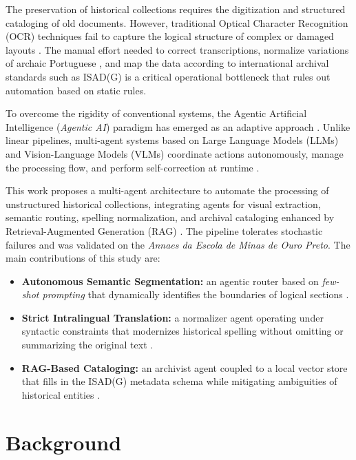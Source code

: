 \documentclass[conference]{IEEEtran}
\begin{document}
The preservation of historical collections requires the digitization and structured cataloging of old documents. However, traditional Optical Character Recognition (OCR) techniques fail to capture the logical structure of complex or damaged layouts \cite{surveyOCR}. The manual effort needed to correct transcriptions, normalize variations of archaic Portuguese \cite{traducaointralingual}, and map the data according to international archival standards such as ISAD(G) \cite{isad_g_2001} is a critical operational bottleneck that rules out automation based on static rules.

To overcome the rigidity of conventional systems, the Agentic Artificial Intelligence (\textit{Agentic AI}) paradigm has emerged as an adaptive approach \cite{agenticaisurvey}. Unlike linear pipelines, multi-agent systems based on Large Language Models (LLMs) and Vision-Language Models (VLMs) coordinate actions autonomously, manage the processing flow, and perform self-correction at runtime \cite{LangChain, zeroshotsemanticsegmentation}.

This work proposes a multi-agent architecture to automate the processing of unstructured historical collections, integrating agents for visual extraction, semantic routing, spelling normalization, and archival cataloging enhanced by Retrieval-Augmented Generation (RAG) \cite{rag}. The pipeline tolerates stochastic failures and was validated on the \textit{Annaes da Escola de Minas de Ouro Preto}. The main contributions of this study are:
\begin{itemize}
    \item \textbf{Autonomous Semantic Segmentation:} an agentic router based on \textit{few-shot prompting} that dynamically identifies the boundaries of logical sections \cite{zeroshotsemanticsegmentation}.
    \item \textbf{Strict Intralingual Translation:} a normalizer agent operating under syntactic constraints that modernizes historical spelling without omitting or summarizing the original text \cite{traducaointralingual}.
    \item \textbf{RAG-Based Cataloging:} an archivist agent coupled to a local vector store that fills in the ISAD(G) metadata schema while mitigating ambiguities of historical entities \cite{rag, isad_g_2001}.
\end{itemize}

\section{Background}
\end{document}
